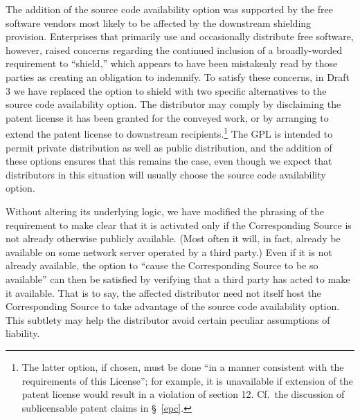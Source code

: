 The addition of the source code availability option was supported by the
free software vendors most likely to be affected by the downstream
shielding provision.  Enterprises that primarily use and occasionally
distribute free software, however, raised concerns regarding the
continued inclusion of a broadly-worded requirement to ``shield,'' which
appears to have been mistakenly read by those parties as creating an
obligation to indemnify.  To satisfy these concerns, in Draft 3 we have
replaced the option to shield with two specific alternatives to the
source code availability option. The distributor may comply by
disclaiming the patent license it has been granted for the conveyed
work, or by arranging to extend the patent license to downstream
recipients.\footnote{The latter option, if chosen, must be done ``in a
manner consistent with the requirements of this License''; for example,
it is unavailable if extension of the patent license would result in a
violation of section 12. Cf.~the discussion of sublicensable patent
claims in \S\ \ref{epc}.}  The GPL is intended to permit private
distribution as well as public distribution, and the addition of these
options ensures that this remains the case, even though we expect that
distributors in this situation will usually choose the source code
availability option.

Without altering its underlying logic, we have modified the phrasing of
the requirement to make clear that it is activated only if the
Corresponding Source is not already otherwise publicly available.  (Most
often it will, in fact, already be available on some network server
operated by a third party.)  Even if it is not already available, the
option to ``cause the Corresponding Source to be so available'' can then
be satisfied by verifying that a third party has acted to make it
available.  That is to say, the affected distributor need not itself
host the Corresponding Source to take advantage of the source code
availability option.  This subtlety may help the distributor avoid
certain peculiar assumptions of liability.

